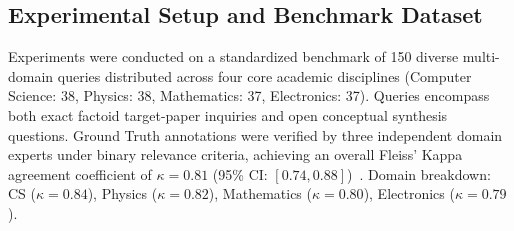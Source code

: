 \documentclass[conference]{IEEEtran}
\begin{document}
\begin{table}[!t]
\caption{QUANTITATIVE BENCHMARK COMPARISON AGAINST STATE-OF-THE-ART BASELINES (MEAN $\pm$ STD. DEV. ACROSS 5 INDEPENDENT RUNS, $N = 150$)}
\label{tab1}
\begin{center}
\end{center}
\end{table}

\subsection{Experimental Setup and Benchmark Dataset}
Experiments were conducted on a standardized benchmark of 150 diverse multi-domain queries distributed across four core academic disciplines (Computer Science: 38, Physics: 38, Mathematics: 37, Electronics: 37). Queries encompass both exact factoid target-paper inquiries and open conceptual synthesis questions. Ground Truth annotations were verified by three independent domain experts under binary relevance criteria, achieving an overall Fleiss' Kappa agreement coefficient of $\kappa = 0.81$ (95\% CI: $[0.74, 0.88]$)~\cite{fleiss1971measuring}. Domain breakdown: CS ($\kappa = 0.84$), Physics ($\kappa = 0.82$), Mathematics ($\kappa = 0.80$), Electronics ($\kappa = 0.79$).
\end{document}
